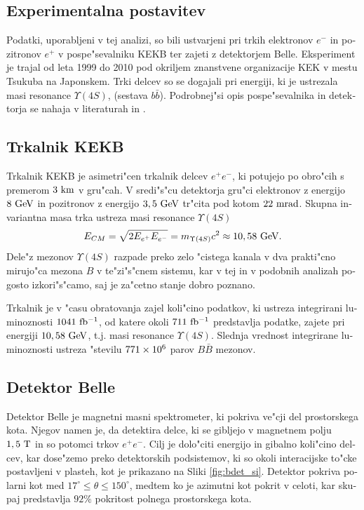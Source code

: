 \begin{otherlanguage}{slovene}
\section{Experimentalna postavitev}

Podatki, uporabljeni v tej analizi, so bili ustvarjeni pri trkih elektronov $e^-$ in pozitronov $e^+$ v pospe"sevalniku KEKB ter zajeti z detektorjem Belle. Eksperiment je trajal od leta 1999 do 2010 pod okriljem znanstvene organizacije KEK v mestu Tsukuba na Japonskem. Trki delcev so se dogajali pri energiji, ki je ustrezala masi resonance $\Upsilon(4S)$, (sestava $b \bar b$). Podrobnej"si opis pospe"sevalnika in detektorja se nahaja v literaturah \cite{doi:10.1093/ptep/pts102} in \cite{ABASHIAN2002117}.

\subsection{Trkalnik KEKB}
Trkalnik KEKB je asimetri"cen trkalnik delcev $e^+e^-$, ki potujejo po obro"cih s premerom $3\mathrm{~km}$ v gru"cah. V sredi"s"cu detektorja gru"ci elektronov z energijo $8\mathrm{~GeV}$ in pozitronov z energijo $3,5\mathrm{~GeV}$ tr"cita pod kotom $22\mathrm{~mrad}$. Skupna invariantna masa trka ustreza masi resonance $\Upsilon(4S)$ 
\begin{equation}
E_{CM} = \sqrt{2E_{e^+}E_{e^-}} = m_{\Upsilon(4S)}c^2 \approx 10,58\mathrm{~GeV}.
\end{equation}
Dele"z mezonov $\Upsilon(4S)$ razpade preko zelo "cistega kanala v dva prakti"cno mirujo"ca mezona $B$ v te"zi"s"cnem sistemu, kar v tej in v podobnih analizah pogosto izkori"s"camo, saj je za"cetno stanje dobro poznano.

Trkalnik je v "casu obratovanja zajel koli"cino podatkov, ki ustreza integrirani luminoznosti $1041\mathrm{~fb^{-1}}$, od katere okoli $711\mathrm{~fb^{-1}}$ predstavlja podatke, zajete pri energiji $10,58\mathrm{~GeV}$, t.j. masi resonance $\Upsilon(4S)$. Slednja vrednost integrirane luminoznosti ustreza "stevilu $771\times 10^{6}$ parov $B \bar B$ mezonov.

\subsection{Detektor Belle}
Detektor Belle je magnetni masni spektrometer, ki pokriva ve"cji del prostorskega kota. Njegov namen je, da detektira delce, ki se gibljejo v magnetnem polju $1,5\mathrm{~T}$ in so potomci trkov $e^+e^-$. Cilj je dolo"citi energijo in gibalno koli"cino delcev, kar dose"zemo preko detektorskih podsistemov, ki so okoli interacijske to"cke postavljeni v plasteh, kot je prikazano na Sliki \ref{fig:bdet_si}. Detektor pokriva polarni kot med $17^\circ \leq \theta \leq 150^\circ$, medtem ko je azimutni kot pokrit v celoti, kar skupaj predstavlja $92\%$ pokritost polnega prostorskega kota.


\end{otherlanguage}
